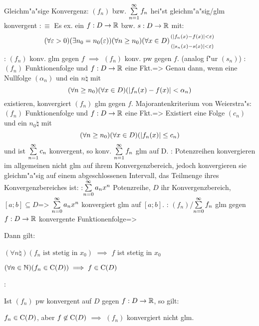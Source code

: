  Gleichm"a"sige Konvergenz:{
  $(f_n)$ bzw. $\sumn 1 f_n$ hei"st gleichm"a"sig/glm konvergent $:\equiv$
  Es ex. ein $f:D\to\mathbb R$ bzw. $s:D\to\mathbb R$ mit:
  \[
    \epsn(\exists n_0=n_0(\epsilon))(\forall n\ge n_0)(\forall x\defined)
      \stack({(|f_n(x)-f(x)|<\epsilon)};{(|s_n(x)-s(x)|<\epsilon)})
  \]
}
\remark:{
  $(f_n)$ konv. glm gegen $f$ $\implies$ $(f_n)$ konv. pw gegen $f$.
  (analog f"ur $(s_n)$)
}
\theorem:
  $(f_n)$ Funktionenfolge und $f:D\to\mathbb R$ eine Fkt.=>
  {
    Genau dann, wenn eine Nullfolge $(\alpha_n)$ und ein $n\natural$ 
    mit
    \[(\forall n\ge n_0)(\forall x\in D)(|f_n(x)-f(x)|<\alpha_n)\]
    existieren, konvergiert $(f_n)$ glm gegen $f$.
  }
\theorem Majorantenkriterium von Weierstra"s:
  $(f_n)$ Funktionenfolge und $f:D\to\mathbb R$ eine Fkt.=>
  {
    Existiert eine Folge $(c_n)$ und ein $n_0\natural$ mit
    \[(\forall n\ge n_0)(\forall x\in D)(|f_n(x)|\le c_n)\]
    und ist $\sumn 1 c_n$ konvergent, so konv. $\sumn 1 f_n$ glm auf D.
  }
\remark:{
  Potenzreihen konvergieren im allgemeinen nicht glm auf ihrem
  Konvergenzbereich, jedoch konvergieren sie gleichm"a"sig auf einem 
  abgeschlossenen Intervall, das Teilmenge ihres Konvergenzbereiches ist:
  }
\theorem:$\sumn 0 a_n x^n$ Potenzreihe, $D$ ihr Konvergenzbereich,
  $[a;b]\subseteq D$=>{
  $\sumn 0 a_n x^n$ konvergiert glm auf $[a;b]$.
  }
\theorem:
  $(f_n)$/$\sumn 0 f_n$ glm gegen $f:D\to\mathbb R$ konvergente Funktionenfolge=>{
  Dann gilt:
  \begin{stmts}
    \item $(\forall n\natural)(f_n \text{ ist stetig in $x_0$})$ $\implies$
            $f$ ist stetig in $x_0$
    \item $(\forall n\in\mathbb N)(f_n\in{\rm C}(D)) \implies f\in{\rm C}(D)$
    \end{stmts}
  }
\remark:{
  Ist $(f_n)$ pw konvergent auf $D$ gegen $f:D\to\mathbb R$, so gilt:\par
  $f_n\in{\rm C}(D)$, aber $f\not\in{\rm C}(D)$ $\implies$ $(f_n)$ konvergiert nicht
  glm.
  }
